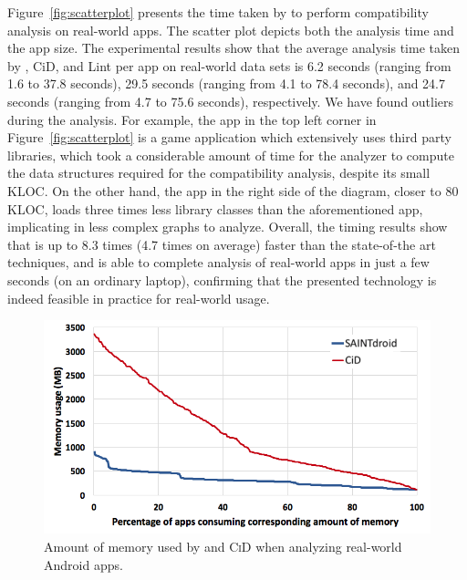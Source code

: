 Figure~\ref{fig:scatterplot} presents the time taken by
\@approach to perform compatibility analysis on
real-world apps.  The scatter plot depicts both the
analysis time and the app size.  The experimental
results show that the average analysis time taken by
\@approach, {\sc CiD}, and {\sc Lint} per app on
real-world data sets is 6.2 seconds (ranging from 1.6
to 37.8 seconds), 29.5 seconds (ranging from 4.1 to
78.4 seconds), and 24.7 seconds (ranging from 4.7 to
75.6 seconds), respectively. We have found outliers
during the analysis. For example, the app in the top
left corner in Figure~\ref{fig:scatterplot} is a game
application which extensively uses third party
libraries, which took a considerable amount of time for
the analyzer to compute the data structures required
for the compatibility analysis, despite its small KLOC.
On the other hand, the app in the right side of the
diagram, closer to 80 KLOC, loads three times less
library classes than the aforementioned app,
implicating in less complex graphs to analyze.
Overall, the timing results show that \@approach  is up
to 8.3 times (4.7 times on average) faster than the
state-of-the art techniques, and is able to complete
analysis of real-world apps in just a few seconds (on
an ordinary laptop), confirming that the presented
technology is indeed feasible in practice for
real-world usage.


\begin{figure}[b!]
	\centering
	    \vspace{-0.4cm}
	\includegraphics[width=0.77\linewidth]{images/memory_gd.png}
	\vspace{-0.5cm}
	\caption{Amount of memory used by \@approach and \textsc{CiD} when analyzing real-world Android apps.}
	\label{fig:memory_gd}
\end{figure}

